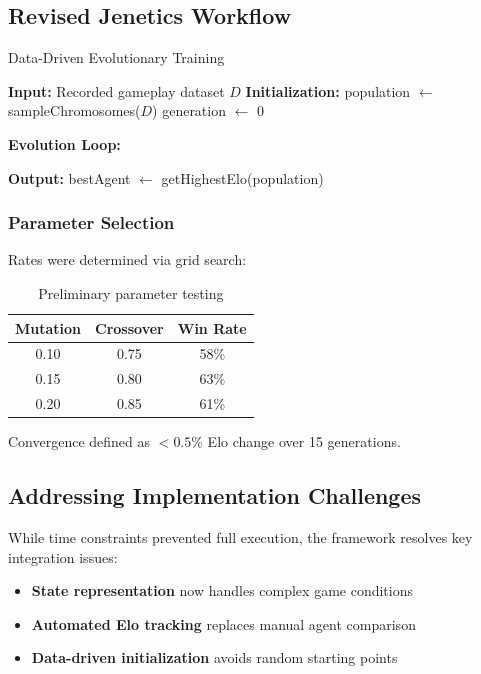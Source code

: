 \documentclass[sigconf]{acmart} %
\begin{document}
\subsection{Revised Jenetics Workflow}
\begin{algorithm}[t]
	\caption{Data-Driven Evolutionary Training}
	\label{alg:jenetics_workflow}
	\DontPrintSemicolon
	
	\textbf{Input:} Recorded gameplay dataset $D$\;
	\nl\textbf{Initialization:} 
	population $\leftarrow$ sampleChromosomes($D$)\;
	generation $\leftarrow$ 0\;
	
	\BlankLine
	\nl\textbf{Evolution Loop:}\;
	\nl {}
	
	\nl\textbf{Output:} 
	bestAgent $\leftarrow$ getHighestElo(population)\;
\end{algorithm}

\subsubsection{Parameter Selection}
Rates were determined via grid search:
\begin{table}[h]
	\centering
	\begin{tabular}{c|c|c}
		Mutation & Crossover & Win Rate \\ \hline
		0.10 & 0.75 & 58\% \\
		0.15 & 0.80 & 63\% \\
		0.20 & 0.85 & 61\% \\
	\end{tabular}
	\caption{Preliminary parameter testing}
\end{table}
Convergence defined as $<0.5\%$ Elo change over 15 generations.


\subsection{Addressing Implementation Challenges}
While time constraints prevented full execution, the framework resolves key integration issues:
\begin{itemize}
	\item \textbf{State representation} now handles complex game conditions
	\item \textbf{Automated Elo tracking} replaces manual agent comparison
	\item \textbf{Data-driven initialization} avoids random starting points
\end{itemize}
\end{document}
